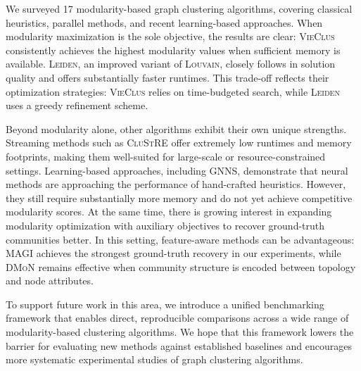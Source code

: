 \documentclass[../paper.tex]{subfiles}
\begin{document}
We surveyed 17 modularity-based graph clustering algorithms, covering classical heuristics, parallel methods, and recent learning-based approaches. When modularity maximization is the sole objective, the results are clear: \textsc{VieClus} consistently achieves the highest modularity values when sufficient memory is available. \textsc{Leiden}, an improved variant of \textsc{Louvain}, closely follows in solution quality and offers substantially faster runtimes. This trade-off reflects their optimization strategies: \textsc{VieClus} relies on time-budgeted search, while \textsc{Leiden} uses a greedy refinement scheme.

Beyond modularity alone, other algorithms exhibit their own unique strengths. Streaming methods such as \textsc{CluStRE} offer extremely low runtimes and memory footprints, making them well-suited for large-scale or resource-constrained settings. Learning-based approaches, including \textsc{GNNS}, demonstrate that neural methods are approaching the performance of hand-crafted heuristics. However, they still require substantially more memory and do not yet achieve competitive modularity scores. At the same time, there is growing interest in expanding modularity optimization with auxiliary objectives to recover ground-truth communities better. In this setting, feature-aware methods can be advantageous: \textsc{MAGI} achieves the strongest ground-truth recovery in our experiments, while \textsc{DMoN} remains effective when community structure is encoded between topology and node attributes.

To support future work in this area, we introduce a unified benchmarking framework that enables direct, reproducible comparisons across a wide range of modularity-based clustering algorithms. We hope that this framework lowers the barrier for evaluating new methods against established baselines and encourages more systematic experimental studies of graph clustering algorithms.

\ifSubfilesClassLoaded{%
}{}
\end{document}
